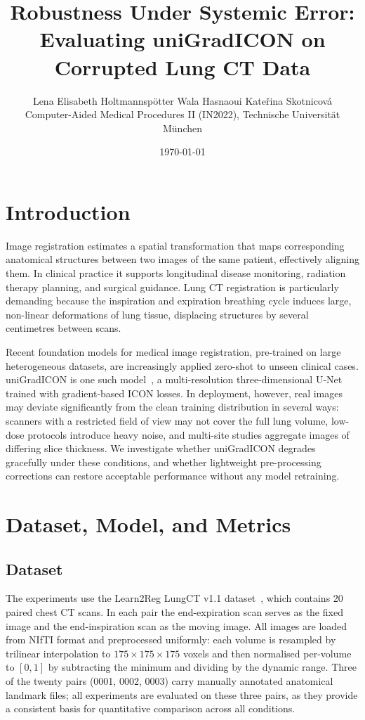\documentclass[11pt]{article}
\title{\large\textbf{Robustness Under Systemic Error:\\[3pt]
       Evaluating uniGradICON on Corrupted Lung CT Data}}
\author{
  Lena Elisabeth Holtmannsp\"{o}tter \quad
  Wala Hasnaoui \quad
  Kate\v{r}ina Skotnicov\'{a}\\[3pt]
  \small Computer-Aided Medical Procedures II (IN2022),
  Technische Universit\"{a}t M\"{u}nchen
}
\date{\today}
\begin{document}
\maketitle

\section{Introduction}

Image registration estimates a spatial transformation that maps corresponding
anatomical structures between two images of the same patient, effectively
aligning them. In clinical practice it supports longitudinal disease
monitoring, radiation therapy planning, and surgical guidance. Lung CT
registration is particularly demanding because the inspiration and expiration
breathing cycle induces large, non-linear deformations of lung tissue,
displacing structures by several centimetres between scans.

Recent foundation models for medical image registration, pre-trained on large
heterogeneous datasets, are increasingly applied zero-shot to unseen clinical
cases. uniGradICON is one such model~\cite{unigradicon}, a multi-resolution
three-dimensional U-Net trained with gradient-based ICON losses. In deployment, however, real
images may deviate significantly from the clean training distribution in
several ways: scanners with a restricted field of view may not cover the full
lung volume, low-dose protocols introduce heavy noise, and multi-site studies
aggregate images of differing slice thickness. We investigate whether
uniGradICON degrades gracefully under these conditions, and whether
lightweight pre-processing corrections can restore acceptable performance
without any model retraining.

\section{Dataset, Model, and Metrics}

\subsection{Dataset}

The experiments use the Learn2Reg LungCT v1.1 dataset~\cite{learn2reg},
which contains 20 paired chest CT scans. In each pair the end-expiration scan serves as the
fixed image and the end-inspiration scan as the moving image. All images are
loaded from NIfTI format and preprocessed uniformly: each volume is resampled
by trilinear interpolation to $175 \times 175 \times 175$ voxels and then
normalised per-volume to $[0, 1]$ by subtracting the minimum and dividing by
the dynamic range. Three of the twenty pairs (0001, 0002, 0003) carry manually
annotated anatomical landmark files; all experiments are evaluated on these
three pairs, as they provide a consistent basis for quantitative comparison
across all conditions.
\end{document}
